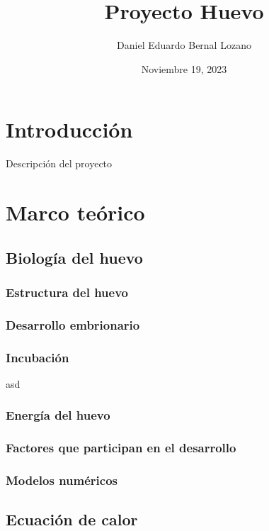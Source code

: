 \documentclass{article}
\title{Proyecto Huevo}
\author{Daniel Eduardo Bernal Lozano}
\date{Noviembre 19, 2023}
\begin{document}
	
	\maketitle
		
	\section{Introducción}
	
	Descripción del proyecto
	\vspace{0.5em}
	
	\section{Marco teórico}
	
	\subsection{Biología del huevo}
	
	\subsubsection{Estructura del huevo}
	
	\subsubsection{Desarrollo embrionario}
	
	\subsubsection{Incubación}
	
	asd
	
	\subsubsection{Energía del huevo}
	
	\subsubsection{Factores que participan en el desarrollo}
	
	\subsubsection{Modelos numéricos}
	
	\subsection{Ecuación de calor}
	
\end{document}
